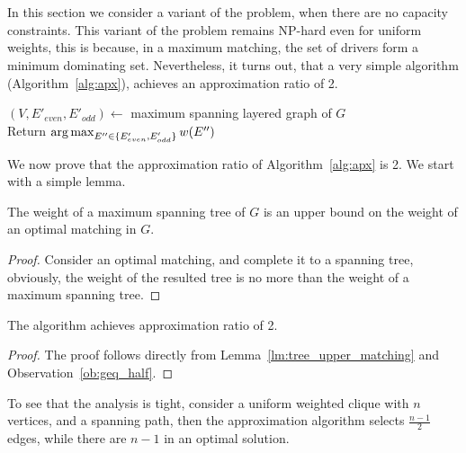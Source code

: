 \section{\UCCARPOOL{}}
\label{sub:ucudcm}
In this section we consider a variant of the problem, 
when there are no capacity constraints.
This variant of the problem remains NP-hard even for uniform weights,
this is because, in a maximum matching, the set of drivers form a minimum
dominating set. 
Nevertheless, it turns out, that a very simple algorithm
(Algorithm~\ref{alg:apx}), achieves an approximation ratio of 2.

\begin{algorithm}
\label{alg:apx}
\caption{\UCCARPOOL{}}
$(V, E'_{even}, E'_{odd}) \leftarrow$ maximum spanning layered graph of $G$		\\
Return $\operatorname*{arg\,max}_{E'' \in \{ E'_{even}, E'_{odd} \}}{w(E'')} $	\\
\end{algorithm}

We now prove that the approximation ratio of Algorithm~\ref{alg:apx} is 2.
We start with a simple lemma.

\begin{lemma}
\label{lm:tree_upper_matching}
The weight of a maximum spanning tree of $G$ is an upper bound on the weight of
an optimal matching in $G$.
\end{lemma}

\begin{proof}
Consider an optimal matching, and complete it to a spanning tree, obviously, the
weight of the resulted tree is no more than the weight of a maximum spanning
tree.
\end{proof}

\begin{theorem}
The \UCCARPOOL{} algorithm achieves approximation ratio of 2.
\end{theorem}

\begin{proof}
The proof follows directly from 
Lemma~\ref{lm:tree_upper_matching} and Observation~\ref{ob:geq_half}.
\end{proof}

To see that the analysis is tight, 
consider a uniform weighted clique with $n$ vertices, 
and a spanning path, 
then the approximation algorithm selects $\frac{n - 1}{2}$ edges, 
while there are $n - 1$ in an optimal solution.  